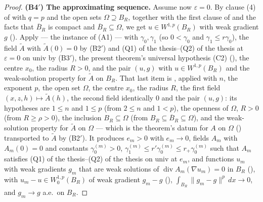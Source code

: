 \begin{proof}
\textbf{(B4$'$) The approximating sequence.}  Assume now $\varepsilon=0$.  By
clause (4) of  with $q=p$ and the open sets
$\Omega\supseteq B_R$, together with the first clause of
 and the facts that $\overline B_R$ is compact and
$\overline B_R\subseteq\Omega$, we get $u\in W^{1,p}(B_R)$ with weak gradient
$g$ ().  Apply  --- the
instance of (A1) --- with $\gamma_0,\gamma_1$ (so $0<\gamma_0$ and
$\gamma_1\le r\gamma_0$), the field $\widetilde A$ with
$\widetilde A(0)=0$ by (B2$'$) and (Q1) of the thesis--(Q2) of the thesis at
$\varepsilon=0$ on $\mathrm{univ}$ by (B3$'$), the present theorem's universal
hypothesis (C2) (), the centre $x_0$, the radius
$R>0$, and the pair $(u,g)$ with $u\in W^{1,p}(B_R)$ and the weak-solution
property for $\widetilde A$ on $B_R$.  That last item is
, applied with $n$, the exponent $p$, the open
set $\Omega$, the centre $x_0$, the radius $R$, the first field
$(x,z,h)\mapsto\widetilde A(h)$, the second field identically $0$ and the pair
$(u,g)$: its hypotheses are $1\le n$ and $1\le p$ (from $2\le n$ and $1<p$), the
openness of $\Omega$, $R>0$ (from $R\ge\rho>0$), the inclusion
$B_R\subseteq\Omega$ (from $B_R\subseteq\overline B_R\subseteq\Omega$), and the
weak-solution property for $\widetilde A$ on $\Omega$ --- which is the theorem's
datum for $A$ on $\Omega$ () transported to
$\widetilde A$ by (B2$'$).  It produces
$e_m>0$ with $e_m\to0$, fields $A_m$ with $A_m(0)=0$ and constants
$\gamma_0^{(m)}>0$, $\gamma_1^{(m)}\le r'\gamma_0^{(m)}\le r_+\gamma_0^{(m)}$
such that $A_m$ satisfies (Q1) of the thesis--(Q2) of the thesis on $\mathrm{univ}$ at
$e_m$, and functions $u_m$ with weak gradients $g_m$ that are weak solutions of
$\operatorname{div}A_m(\nabla u_m)=0$ in $B_R$
(), with $u_m-u\in W^{1,p}_0(B_R)$ of weak gradient
$g_m-g$ (),
$\int_{B_R}\|g_m-g\|^p\,dx\to0$, and $g_m\to g$ a.e.\ on $B_R$.


\end{proof}
